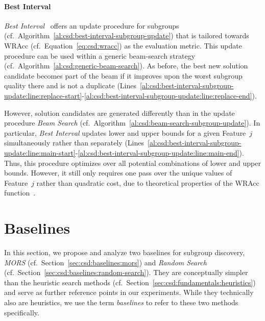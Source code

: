 \documentclass{article}
\theoremstyle{definition}
\begin{document}
\paragraph{Best Interval}

\emph{Best Interval}~\cite{mampaey2012efficient} offers an update procedure for subgroups (cf.~Algorithm~\ref{al:csd:best-interval-subgroup-update}) that is tailored towards WRAcc (cf.~Equation~\ref{eq:csd:wracc}) as the evaluation metric.
This update procedure can be used within a generic beam-search strategy (cf.~Algorithm~\ref{al:csd:generic-beam-search}).
As before, the best new solution candidate becomes part of the beam if it improves upon the worst subgroup quality there and is not a duplicate (Lines~\ref{al:csd:best-interval-subgroup-update:line:replace-start}-\ref{al:csd:best-interval-subgroup-update:line:replace-end}).

However, solution candidates are generated differently than in the update procedure \emph{Beam Search} (cf.~Algorithm~\ref{al:csd:beam-search-subgroup-update}).
In particular, \emph{Best Interval} updates lower and upper bounds for a given Feature~$j$ simultaneously rather than separately (Lines~\ref{al:csd:best-interval-subgroup-update:line:main-start}-\ref{al:csd:best-interval-subgroup-update:line:main-end}).
Thus, this procedure optimizes over all potential combinations of lower and upper bounds.
However, it still only requires one pass over the unique values of Feature~$j$ rather than quadratic cost, due to theoretical properties of the WRAcc function~\cite{mampaey2012efficient}.

\section{Baselines}
\label{sec:csd:baselines}

In this section, we propose and analyze two baselines for subgroup discovery, \emph{MORS} (cf.~Section~\ref{sec:csd:baselines:mors}) and \emph{Random Search} (cf.~Section~\ref{sec:csd:baselines:random-search}).
They are conceptually simpler than the heuristic search methods (cf.~Section~\ref{sec:csd:fundamentals:heuristics}) and serve as further reference points in our experiments.
While they technically also are heuristics, we use the term \emph{baselines} to refer to these two methods specifically.
\end{document}
